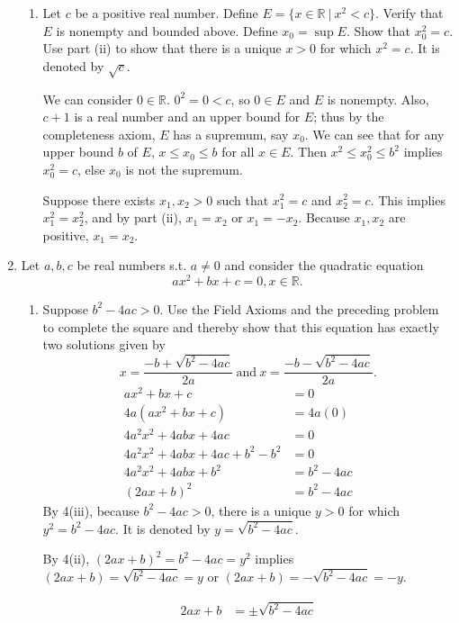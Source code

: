 \begin{enumerate}
\begin{enumerate}[label=(\roman*),align=left]
        \item Let $c$ be a positive real number. Define $E = \{ x \in \mathbb{R} \ |\  x^2 < c\}$. Verify that $E$ is nonempty and bounded above.
		Define $x_0 = \sup E$. Show that $x_0^2 = c$. Use part (ii) to show that there is a unique $x>0$ for which $x^2=c$. It is denoted by $\sqrt{c}$.\par
		We can consider $0\in \mathbb{R}$. $0^2=0<c$, so $0\in E$ and $E$ is nonempty. Also, $c+1$ is a real number and an upper bound for $E$; thus by the completeness axiom, $E$ has a supremum, say $x_0$.
		We can see that for any upper bound $b$ of $E$, $x \le x_0 \le b$ for all $x \in E$. Then $x^2 \le x_0^2 \le b^2$ implies $x_0^2=c$, else $x_0$ is not the supremum. \par
		Suppose there exists $x_1,x_2 > 0$ such that $x_1^2 = c$ and $x_2^2 = c$. This implies $x_1^2 = x_2^2$, and by part (ii), $x_1 = x_2$ or $x_1 = -x_2$. Because $x_1,x_2$ are positive, $x_1 = x_2$.
    \end{enumerate}
	\item Let $a,b,c$ be real numbers s.t. $a\neq 0$ and consider the quadratic equation \[ ax^2+bx+c=0, x \in \mathbb{R}.\]
	\begin{enumerate}[label=(\roman*),align=left]
        \item Suppose $b^2 - 4ac >0$. Use the Field Axioms and the preceding problem to complete the square and thereby show that this equation has exactly two solutions given by
		\[  x = \dfrac{-b + \sqrt{b^2-4ac}}{2a} \ \text{and}\  x = \dfrac{-b - \sqrt{b^2-4ac}}{2a}. \]
		\begin{align*}
			ax^2+bx+c & = 0 \\
			4a(ax^2+bx+c) & = 4a(0) \\
			4a^2x^2+4abx+4ac & = 0 && \tag*{by distributive property}\\
			4a^2x^2+4abx+4ac+b^2-b^2 & = 0 && \tag*{by additive inverse}\\
			4a^2x^2+4abx+b^2 & = b^2-4ac \\
			(2ax+b)^2 & = b^2-4ac 
		\end{align*}
		By 4(iii), because $b^2 - 4ac >0$, there is a unique $y>0$ for which $y^2 = b^2-4ac$. It is denoted by $y = \sqrt{b^2-4ac}$.\par
		By 4(ii), $(2ax+b)^2 = b^2-4ac = y^2$ implies $(2ax+b) = \sqrt{b^2-4ac} = y$ or $(2ax+b) = -\sqrt{b^2-4ac} = -y.$\par
		\begin{align*}
			2ax+b & = \pm \sqrt{b^2-4ac} \\

\end{align*}
\end{enumerate}
\end{enumerate}
